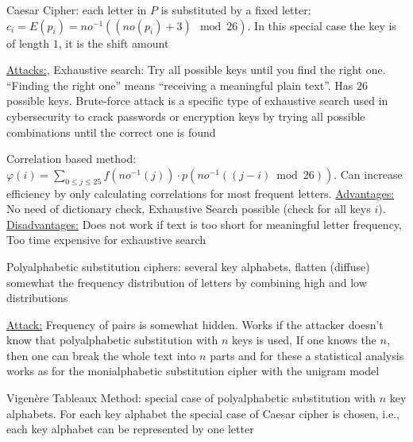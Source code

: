 \documentclass[landscape, a4paper]{article}
\begin{document}
\begin{minipage}[t]{0.2\linewidth}
\begin{betterlist}
\begin{betterlist}
\begin{betterlist}
			\end{betterlist}
			\begin{betterlist}
				\item \alert{Caesar Cipher:} each letter in $P$ is substituted by a fixed letter: $c_i = E(p_i) = no^{-1}((no(p_i) + 3) \mod 26)$. In this special case the \alert{key} is of length $1$, it is the shift amount
				\begin{betterlist}
					\item \underline{Attacks:}, \alert{Exhaustive search:} Try all possible keys until you find the right one. \enquote{Finding the right one} means \enquote{receiving a meaningful plain text}. Has $26$ possible keys. \alert{Brute-force attack} is a specific type of exhaustive search used in cybersecurity to crack passwords or encryption keys by trying all possible combinations until the correct one is found
          \item \alert{Correlation based method:} $\varphi(i)=\sum_{0 \leq j \leq 25} f\left(n o^{-1}(j)\right) \cdot p\left(n o^{-1}((j-i) \bmod 26)\right)$. Can increase efficiency by only calculating correlations for most frequent letters. \underline{Advantages:} No need of dictionary check, Exhaustive Search possible (check for all keys $i$). \underline{Disadvantages:} Does not work if text is too short for meaningful letter frequency, Too time expensive for exhaustive search
				\end{betterlist}
			\end{betterlist}
		\end{betterlist}
		\begin{betterlist}
			\item \alert{Polyalphabetic substitution ciphers:} several key alphabets, flatten (diffuse) somewhat the frequency distribution of letters by combining high and low distributions
			\begin{betterlist}
				\item \underline{Attack:} Frequency of pairs is somewhat hidden. Works if the attacker doesn't know that polyalphabetic substitution with $n$ keys is used, If one knows the $n$, then one can break the whole text into $n$ parts and for these a \alert{statistical analysis} works as for the monialphabetic substitution cipher with the unigram model
			\end{betterlist}
			\begin{betterlist}
				\item \alert{Vigenère Tableaux Method:} special case of polyalphabetic substitution with $n$ key alphabets. For each key alphabet the special case of Caesar cipher is chosen, i.e., each key alphabet can be represented by one letter%

\end{betterlist}
\end{betterlist}
\end{betterlist}
\end{minipage}
\end{document}
